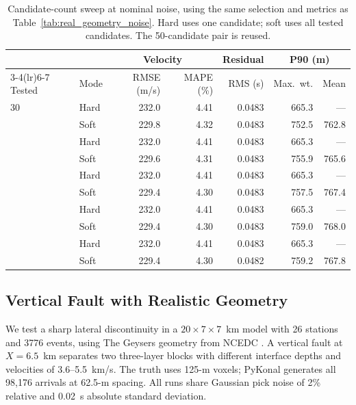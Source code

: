 \begin{table}[!htb]
\centering
\begin{singlespace}
\small
\setlength{\tabcolsep}{3.5pt}
\caption{Candidate-count sweep at nominal noise, using the same selection and metrics as Table~\ref{tab:real_geometry_noise}. Hard uses one candidate; soft uses all tested candidates. The 50-candidate pair is reused.}
\label{tab:real_geometry_candidates}
\smallskip
\begin{tabular}{llrrrrr}
\toprule
& & \multicolumn{2}{c}{Velocity} & Residual & \multicolumn{2}{c}{P90 (m)} \\
\cmidrule(lr){3-4}\cmidrule(lr){6-7}
Tested & Mode & RMSE (m/s) & MAPE (\%) & RMS (s) & Max.\ wt. & Mean \\
\midrule
30 & Hard & 232.0 & 4.41 & 0.0483 & 665.3 & --- \\
 & Soft & 229.8 & 4.32 & 0.0483 & 752.5 & 762.8 \\
\addlinespace
50 & Hard & 232.0 & 4.41 & 0.0483 & 665.3 & --- \\
 & Soft & 229.6 & 4.31 & 0.0483 & 755.9 & 765.6 \\
\addlinespace
100 & Hard & 232.0 & 4.41 & 0.0483 & 665.3 & --- \\
 & Soft & 229.4 & 4.30 & 0.0483 & 757.5 & 767.4 \\
\addlinespace
150 & Hard & 232.0 & 4.41 & 0.0483 & 665.3 & --- \\
 & Soft & 229.4 & 4.30 & 0.0483 & 759.0 & 768.0 \\
\addlinespace
200 & Hard & 232.0 & 4.41 & 0.0483 & 665.3 & --- \\
 & Soft & 229.4 & 4.30 & 0.0482 & 759.2 & 767.8 \\
\bottomrule
\end{tabular}
\end{singlespace}
\end{table}
\FloatBarrier

\subsection{Vertical Fault with Realistic Geometry}
\label{subsec:fault_results}

We test a sharp lateral discontinuity in a $20\times7\times7$~km model with 26 stations and 3776 events, using The Geysers geometry from NCEDC \parencite{ncedc2014}. A vertical fault at $X=6.5$~km separates two three-layer blocks with different interface depths and velocities of 3.6--5.5~km/s. The truth uses 125-m voxels; PyKonal generates all 98,176 arrivals at 62.5-m spacing. All runs share Gaussian pick noise of 2\% relative and 0.02~s absolute standard deviation.

